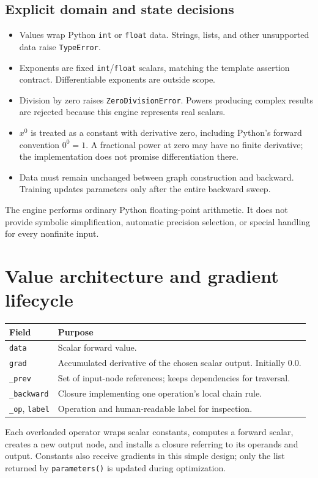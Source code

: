 \documentclass[11pt,a4paper]{article}
\newcommand{\code}[1]{\texttt{#1}}
\begin{document}
\subsection{Explicit domain and state decisions}
\begin{itemize}
\item Values wrap Python \code{int} or \code{float} data. Strings, lists, and
other unsupported data raise \code{TypeError}.
\item Exponents are fixed \code{int}/\code{float} scalars, matching the
template assertion contract. Differentiable exponents are outside scope.
\item Division by zero raises \code{ZeroDivisionError}. Powers producing
complex results are rejected because this engine represents real scalars.
\item $x^0$ is treated as a constant with derivative zero, including Python's
forward convention $0^0=1$. A fractional power at zero may have no finite
derivative; the implementation does not promise differentiation there.
\item Data must remain unchanged between graph construction and backward.
Training updates parameters only after the entire backward sweep.
\end{itemize}
The engine performs ordinary Python floating-point arithmetic. It does not
provide symbolic simplification, automatic precision selection, or special
handling for every nonfinite input.
\clearpage

\section{Value architecture and gradient lifecycle}
\begin{center}
\begin{tabular}{p{.19\linewidth}p{.72\linewidth}}
\toprule
Field & Purpose\\\midrule
\code{data} & Scalar forward value.\\
\code{grad} & Accumulated derivative of the chosen scalar output. Initially 0.0.\\
\code{\_prev} & Set of input-node references; keeps dependencies for traversal.\\
\code{\_backward} & Closure implementing one operation's local chain rule.\\
\code{\_op}, \code{label} & Operation and human-readable label for inspection.\\
\bottomrule
\end{tabular}
\end{center}
Each overloaded operator wraps scalar constants, computes a forward scalar,
creates a new output node, and installs a closure referring to its operands and
output. Constants also receive gradients in this simple design; only the list
returned by \code{parameters()} is updated during optimization.
\end{document}
